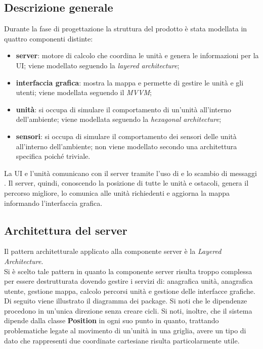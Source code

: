 \subsection{Descrizione generale}
	Durante la fase di progettazione la struttura del prodotto è stata modellata in quattro componenti distinte:
	\begin{itemize}
		\item \textbf{server}: motore di calcolo che coordina le unità e genera le informazioni per la UI; viene modellato seguendo la \textit{layered architecture};
		\item \textbf{interfaccia grafica}: mostra la mappa e permette di gestire le unità e gli utenti; viene modellata seguendo il \textit{MVVM};
		\item \textbf{unità}: si occupa di simulare il comportamento di un'unità all'interno dell'ambiente; viene modellata seguendo la \textit{hexagonal architecture};
		\item \textbf{sensori}: si occupa di simulare il comportamento dei sensori delle unità all'interno dell'ambiente; non viene modellato secondo una architettura specifica poiché triviale.
	\end{itemize}
	La UI e l'unità comunicano con il server tramite l'uso di  e lo scambio di messaggi . Il server, quindi, conoscendo la posizione di tutte le unità e ostacoli, genera il percorso migliore, lo comunica alle unità richiedenti e aggiorna la mappa informando l'interfaccia grafica.\\

\subsection{Architettura del server}
	Il pattern architetturale applicato alla componente server è la \textit{Layered Architecture}. \\
	Si è scelto tale pattern in quanto la componente server risulta troppo complessa per essere destrutturata dovendo gestire i servizi di: anagrafica unità, anagrafica utente, gestione mappa, calcolo percorsi unità e gestione delle interfacce grafiche.\\
	Di seguito viene illustrato il diagramma dei package. Si noti che le dipendenze procedono in un'unica direzione senza creare cicli. Si noti, inoltre, che il sistema dipende dalla classe \textbf{Position} in ogni suo punto in quanto, trattando problematiche legate al movimento di un'unità in una griglia, avere un tipo di dato che rappresenti due coordinate cartesiane risulta particolarmente utile.

